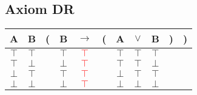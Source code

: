 \documentclass{article}
\begin{document}
\subsection{Axiom DR}
\begin{tabular}{@{ }c@{ }@{ }c | c@{}@{ }c@{ }@{ }c@{ }@{}c@{}@{ }c@{ }@{ }c@{ }@{ }c@{ }@{}c@{}@{}c@{ }}
A & B & ( & B & $\rightarrow$ & ( & A & $\lor$ & B & ) & )\\
\hline 
$\top$ & $\top$ &  & $\top$ & \textcolor{red}{$\top$} &  & $\top$ & $\top$ & $\top$ &  & \\
$\top$ & $\bot$ &  & $\bot$ & \textcolor{red}{$\top$} &  & $\top$ & $\top$ & $\bot$ &  & \\
$\bot$ & $\top$ &  & $\top$ & \textcolor{red}{$\top$} &  & $\bot$ & $\top$ & $\top$ &  & \\
$\bot$ & $\bot$ &  & $\bot$ & \textcolor{red}{$\top$} &  & $\bot$ & $\bot$ & $\bot$ &  & \\
\end{tabular}
\end{document}
